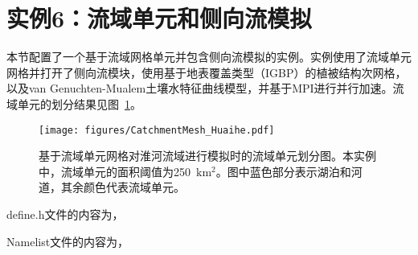 \documentclass[a4paper,12pt,twoside]{article}
\begin{document}
\section{实例6：流域单元和侧向流模拟}

本节配置了一个基于流域网格单元并包含侧向流模拟的实例。实例使用了流域单元网格并打开了侧向流模块，使用基于地表覆盖类型（IGBP）的植被结构次网格，以及van Genuchten-Mualem土壤水特征曲线模型，并基于MPI进行并行加速。流域单元的划分结果见图~\ref{fig:fig_huaihe}。

\begin{figure}[htpb]
    \centering
    \texttt{[image: figures/CatchmentMesh\_Huaihe.pdf]}
    \caption{基于流域单元网格对淮河流域进行模拟时的流域单元划分图。本实例中，流域单元的面积阈值为250~$\mathrm{km^2}$。图中蓝色部分表示湖泊和河道，其余颜色代表流域单元。}
    \label{fig:fig_huaihe}
\end{figure}

define.h文件的内容为，


Namelist文件的内容为，

\end{document}
